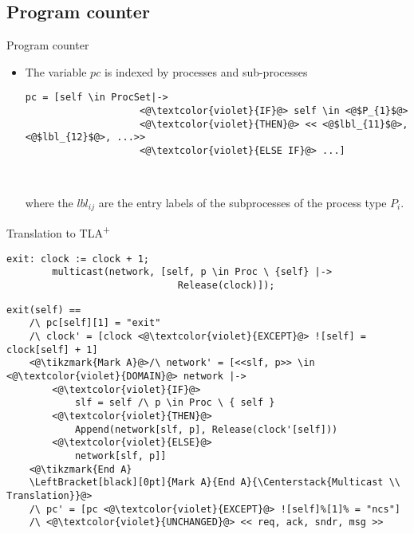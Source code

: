 \documentclass{beamer}
\newcommand{\tikzmark}[1]{%
  \tikz[overlay,remember picture,baseline] \node [anchor=base] (#1) {};}
\newcommand{\tlaplus}{TLA\textsuperscript{+}\xspace}
\begin{document}
\subsection{Program counter}

\begin{frame}[fragile]{Program counter}
    \begin{itemize}
     \item The variable $pc$ is indexed by processes and sub-processes

\medskip

\begin{lstlisting}[language=pluscal, frame = none, numbers = none]
pc = [self \in ProcSet|->
                    <@\textcolor{violet}{IF}@> self \in <@$P_{1}$@> 
                    <@\textcolor{violet}{THEN}@> << <@$lbl_{11}$@>, <@$lbl_{12}$@>, ...>>
                    <@\textcolor{violet}{ELSE IF}@> ...]
                    
                    
\end{lstlisting}
	
\medskip

where the $lbl_{ij}$ are the entry labels of the subprocesses of the process type $P_i$.

\end{itemize}
\end{frame}

\begin{frame}[fragile]{Translation to \tlaplus}

\begin{lstlisting}[language=pluscal, frame = tlrb, numbers=none]  
 exit: clock := clock + 1;
        multicast(network, [self, p \in Proc \ {self} |->
                              Release(clock)]);
\end{lstlisting}
\begin{lstlisting}[language=pluscal, frame = tlrb, numbers=none]  
exit(self) == 
    /\ pc[self][1] = "exit"
    /\ clock' = [clock <@\textcolor{violet}{EXCEPT}@> ![self] = clock[self] + 1]
    <@\tikzmark{Mark A}@>/\ network' = [<<slf, p>> \in <@\textcolor{violet}{DOMAIN}@> network |->
        <@\textcolor{violet}{IF}@> 
            slf = self /\ p \in Proc \ { self } 
        <@\textcolor{violet}{THEN}@> 
            Append(network[slf, p], Release(clock'[self])) 
        <@\textcolor{violet}{ELSE}@>
            network[slf, p]]
    <@\tikzmark{End A}
    \LeftBracket[black][0pt]{Mark A}{End A}{\Centerstack{Multicast \\ Translation}}@>
    /\ pc' = [pc <@\textcolor{violet}{EXCEPT}@> ![self]%[1]% = "ncs"]
    /\ <@\textcolor{violet}{UNCHANGED}@> << req, ack, sndr, msg >>
\end{lstlisting}
\end{frame}
\end{document}
